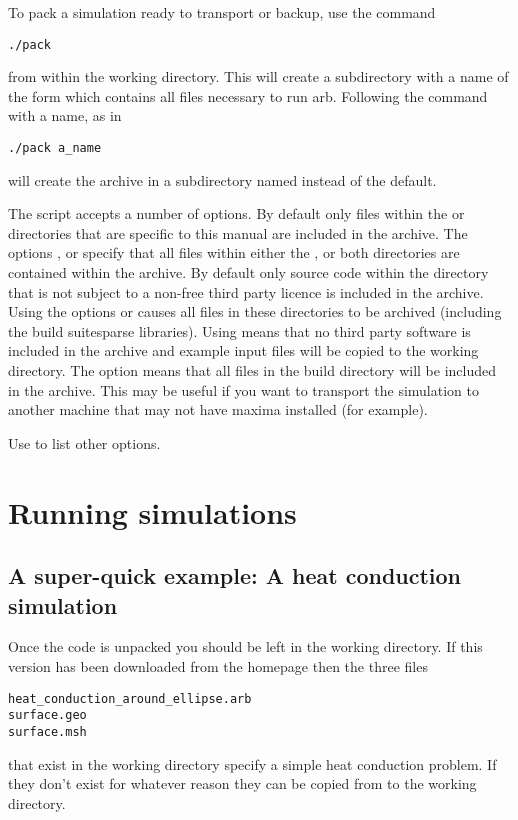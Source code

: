 To pack a simulation ready to transport or backup, use the command
%
\begin{verbatim}
./pack
\end{verbatim}
%
from within the working directory.  This will create a subdirectory with a name of the form  which contains all files necessary to run arb.  Following the command with a name, as in
%
\begin{verbatim}
./pack a_name
\end{verbatim}
%
will create the archive in a subdirectory named  instead of the default.

The script  accepts a number of options.  By default only files within the  or  directories that are specific to this manual are included in the archive.  The options ,  or  specify that all files within either the ,  or both directories are contained within the archive.  By default only source code within the  directory that is not subject to a non-free third party licence is included in the archive.  Using the options  or  causes all files in these directories to be archived (including the build suitesparse libraries).  Using  means that no third party software is included in the archive and example input files will be copied to the working directory.  The option  means that all files in the build directory will be included in the archive.  This may be useful if you want to transport the simulation to another machine that may not have maxima installed (for example).

Use  to list other options. 


\pagebreak
\section{Running simulations \label{sec:running_arb}}

\subsection{A super-quick example:  A heat conduction simulation}

Once the code is unpacked you should be left in the working directory.  If this version has been downloaded from the homepage then the three files
%
\begin{verbatim}
heat_conduction_around_ellipse.arb
surface.geo
surface.msh
\end{verbatim}
%
that exist in the working directory specify a simple heat conduction problem.  If they don't exist for whatever reason they can be copied from  to the working directory.

